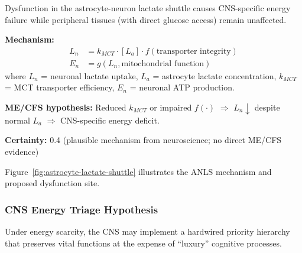 \begin{speculation}
\label{spec:astrocyte-gate}
Dysfunction in the astrocyte-neuron lactate shuttle causes CNS-specific energy failure while peripheral tissues (with direct glucose access) remain unaffected.

\textbf{Mechanism:}
\begin{align}
L_n &= k_{MCT} \cdot [L_a] \cdot f(\text{transporter integrity}) \\
E_n &= g(L_n, \text{mitochondrial function})
\end{align}
where $L_n$ = neuronal lactate uptake, $L_a$ = astrocyte lactate concentration, $k_{MCT}$ = MCT transporter efficiency, $E_n$ = neuronal ATP production.

\textbf{ME/CFS hypothesis:} Reduced $k_{MCT}$ or impaired $f(\cdot)$ $\Rightarrow$ $L_n \downarrow$ despite normal $L_a$ $\Rightarrow$ CNS-specific energy deficit.

\textbf{Certainty:} 0.4 (plausible mechanism from neuroscience; no direct ME/CFS evidence)
\end{speculation}

Figure~\ref{fig:astrocyte-lactate-shuttle} illustrates the ANLS mechanism and proposed dysfunction site.




\subsubsection{CNS Energy Triage Hypothesis}

Under energy scarcity, the CNS may implement a hardwired priority hierarchy that preserves vital functions at the expense of ``luxury'' cognitive processes.

